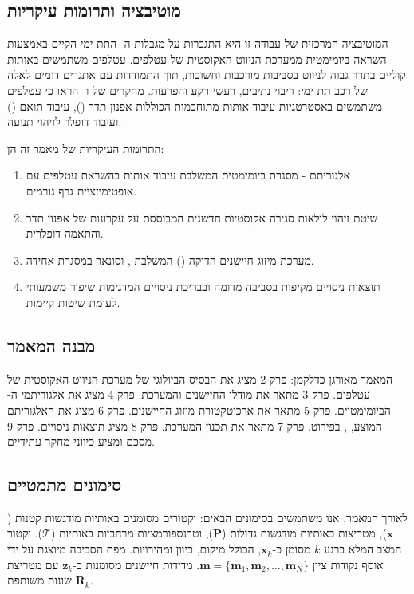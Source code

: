 \subsection{מוטיבציה ותרומות עיקריות}
\label{sec:motivation}

המוטיבציה המרכזית של עבודה זו היא התגברות על מגבלות ה- התת-ימי הקיים באמצעות השראה ביומימטית ממערכת הניווט האקוסטית של עטלפים. עטלפים משתמשים באותות קוליים בתדר גבוה לניווט בסביבות מורכבות וחשוכות, תוך התמודדות עם אתגרים דומים לאלה של רכב תת-ימי: ריבוי נתיבים, רעשי רקע והפרעות. מחקרים של \citet{GriffinBatEcholocation} ו-\citet{Simmons1979BatSonar} הראו כי עטלפים משתמשים באסטרטגיות עיבוד אותות מתוחכמות הכוללות אפנון תדר (), עיבוד תואם () ועיבוד דופלר לזיהוי תנועה.

התרומות העיקריות של מאמר זה הן:
\begin{enumerate}
    \item אלגוריתם  - מסגרת  ביומימטית המשלבת עיבוד אותות בהשראת עטלפים עם אופטימיזציית גרף גורמים.
    \item שיטת זיהוי לולאות סגירה אקוסטיות חדשנית המבוססת על עקרונות של אפנון תדר והתאמה דופלרית.
    \item מערכת מיזוג חיישנים הדוקה () המשלבת ,  וסונאר במסגרת  אחידה.
    \item תוצאות ניסויים מקיפות בסביבה מדומה ובבריכת ניסויים המדגימות שיפור משמעותי לעומת שיטות קיימות.
\end{enumerate}

\subsection{מבנה המאמר}
\label{sec:paper_structure}

המאמר מאורגן כדלקמן: פרק 2 מציג את הבסיס הביולוגי של מערכת הניווט האקוסטית של עטלפים. פרק 3 מתאר את מודלי החיישנים והמערכת. פרק 4 מציג את אלגוריתמי ה- הביומימטיים. פרק 5 מתאר את ארכיטקטורת מיזוג החיישנים. פרק 6 מציג את האלגוריתם המוצע, , בפירוט. פרק 7 מתאר את תכנון המערכת. פרק 8 מציג תוצאות ניסויים. פרק 9 מסכם ומציע כיווני מחקר עתידיים.

\subsection{סימונים מתמטיים}
\label{sec:notation}

לאורך המאמר, אנו משתמשים בסימונים הבאים: וקטורים מסומנים באותיות מודגשות קטנות ($\mathbf{x}$), מטריצות באותיות מודגשות גדולות ($\mathbf{P}$), וטרנספורמציות מרחביות באותיות  ($\mathcal{T}$). וקטור המצב המלא ברגע $k$ מסומן כ-$\mathbf{x}_k$, הכולל מיקום, כיוון ומהירויות. מפת הסביבה מיוצגת על ידי אוסף נקודות ציון $\mathbf{m} = \{\mathbf{m}_1, \mathbf{m}_2, \ldots, \mathbf{m}_N\}$. מדידות חיישנים מסומנות כ-$\mathbf{z}_k$ עם מטריצת שונות משותפת $\mathbf{R}_k$.

